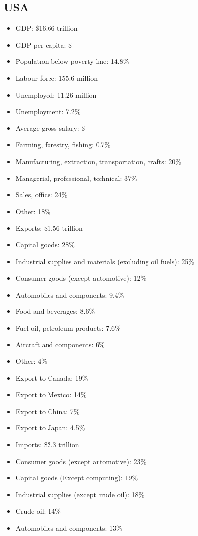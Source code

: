 \documentclass{article}
\begin{document}
\subsection{USA}
\begin{itemize}
	\item GDP: \$16.66 trillion
	\item GDP per capita: \$
	\item Population below poverty line: 14.8\%
	\item Labour force: 155.6 million
	\item Unemployed: 11.26 million
	\item Unemployment: 7.2\%
	\item Average gross salary: \$
	\item Farming, forestry, fishing: 0.7\%
	\item Manufacturing, extraction, transportation, crafts: 20\%
	\item Managerial, professional, technical: 37\%
	\item Sales, office: 24\%
	\item Other: 18\%
	\item Exports: \$1.56 trillion
	\item Capital goods: 28\%
	\item Industrial supplies and materials (excluding oil fuels): 25\%
	\item Consumer goods (except automotive): 12\%
	\item Automobiles and components: 9.4\%
	\item Food and beverages: 8.6\%
	\item Fuel oil, petroleum products: 7.6\%
	\item Aircraft and components: 6\%
	\item Other: 4\%
	\item Export to Canada: 19\%
	\item Export to Mexico: 14\%
	\item Export to China: 7\%
	\item Export to Japan: 4.5\%
	\item Imports: \$2.3 trillion
	\item Consumer goods (except automotive): 23\%
	\item Capital goods (Except computing): 19\%
	\item Industrial supplies (except crude oil): 18\%
	\item Crude oil: 14\%
	\item Automobiles and components: 13\%

\end{itemize}
\end{document}
